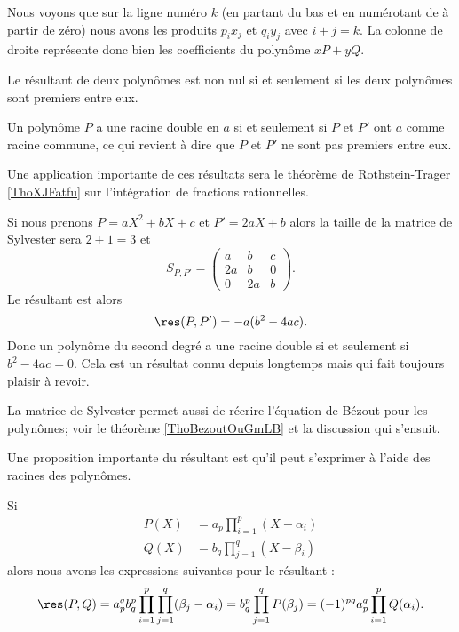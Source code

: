 Nous voyons que sur la ligne numéro \( k\) (en partant du bas et en numérotant de à partir de zéro) nous avons les produits \( p_ix_j\) et \( q_iy_j\) avec \( i+j=k\). La colonne de droite représente donc bien les coefficients du polynôme \( xP+yQ\).


\begin{proposition} \label{PropAPxzcUl}
    Le résultant de deux polynômes est non nul si et seulement si les deux polynômes sont premiers entre eux.
\end{proposition}

Un polynôme \( P\) a une racine double en \( a\) si et seulement si \( P\) et \( P'\) ont \( a\) comme racine commune, ce qui revient à dire que \( P\) et \( P'\) ne sont pas premiers entre eux. 

Une application importante de ces résultats sera le théorème de Rothstein-Trager \ref{ThoXJFatfu} sur l'intégration de fractions rationnelles.

\begin{example}
    Si nous prenons \( P=aX^2+bX+c\) et \( P'=2aX+b\) alors la taille de la matrice de Sylvester sera \( 2+1=3\) et
    \begin{equation}
        S_{P,P'}=\begin{pmatrix}
              a  &   b    &   c    \\
            2a    &   b    &   0    \\
            0    &   2a    &   b
        \end{pmatrix}.
    \end{equation}
    Le résultant est alors
    \begin{equation}
        \res(P,P')=-a(b^2-4ac).
    \end{equation}
    Donc un polynôme du second degré a une racine double si et seulement si \( b^2-4ac=0\). Cela est un résultat connu depuis longtemps mais qui fait toujours plaisir à revoir.
\end{example}

La matrice de Sylvester permet aussi de récrire l'équation de Bézout pour les polynômes; voir le théorème \ref{ThoBezoutOuGmLB} et la discussion qui s'ensuit.

Une proposition importante du résultant est qu'il peut s'exprimer à l'aide des racines des polynômes.
\begin{proposition} \label{PropNDBOGNx}
    Si
    \begin{subequations}
        \begin{align}
        P(X)&=a_p\prod_{i=1}^p(X-\alpha_i)\\
        Q(X)&=b_q\prod_{j=1}^q(X-\beta_i)
        \end{align}
    \end{subequations}
    alors nous avons les expressions suivantes pour le résultant :
    \begin{equation}        \label{EqCFUumjx}
        \res(P,Q)=a_p^qb_q^p\prod_{i=1}^p\prod_{j=1}^q(\beta_j-\alpha_i)=b_q^p\prod_{j=1}^qP(\beta_j)=(-1)^{pq}a_p^q\prod_{i=1}^pQ(\alpha_i).
    \end{equation}
\end{proposition}

